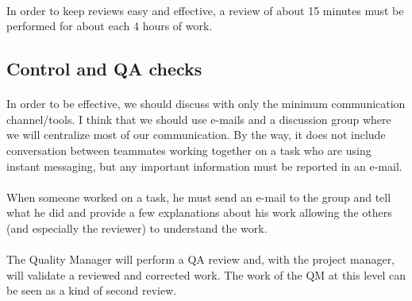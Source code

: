 \paragraph{} In order to keep reviews easy and effective, a review of about 15
minutes must be performed for about each 4 hours of work.

\subsection{Control and QA checks}

\paragraph{} In order to be effective, we should discuss with only the minimum
communication channel/tools. I think that we should use e-mails and a discussion
group where we will centralize most of our communication. By the way, it does
not include conversation between teammates working together on a task who are
using instant messaging, but any important information must be reported in an
e-mail.

\paragraph{} When someone worked on a task, he must send an e-mail to the group
and tell what he did and provide a few explanations about his work allowing the
others (and especially the reviewer) to understand the work.

\paragraph{} The Quality Manager will perform a QA review and, with the project
manager, will validate a reviewed and corrected work. The work of the QM at this
level can be seen as a kind of second review.
